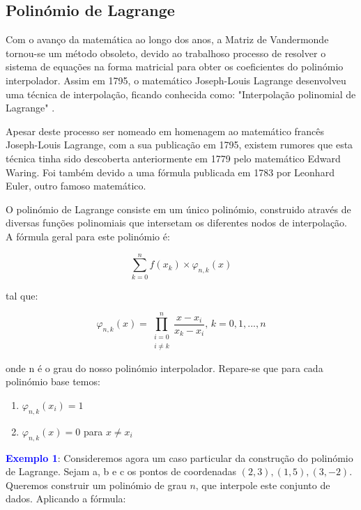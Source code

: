 \documentclass[12pt]{article}
\begin{document}
   
   



   

\subsection{Polinómio de Lagrange}
\hspace{0.5cm}Com o avanço da matemática ao longo dos anos, a Matriz de Vandermonde tornou-se um método obsoleto, devido ao trabalhoso processo de resolver o sistema de equações na forma matricial para obter os coeficientes do polinómio interpolador. Assim em 1795, o matemático Joseph-Louis Lagrange desenvolveu uma técnica de interpolação, ficando conhecida como: "Interpolação polinomial de Lagrange" \cite{wikipedia1}.

\hspace{0.5cm}Apesar deste processo ser nomeado em homenagem ao matemático francês Joseph-Louis Lagrange, com a sua publicação em 1795, existem rumores que esta técnica tinha sido descoberta anteriormente em 1779 pelo matemático Edward Waring. Foi também devido a uma fórmula publicada em 1783 por Leonhard Euler, outro famoso matemático.

\hspace{0.5cm}O polinómio de Lagrange consiste em um único polinómio, construido através de diversas funções polinomiais que intersetam os diferentes nodos de interpolação. A fórmula geral para este polinómio é:

\begin{equation}
    \sum_{k=0}^{n} f(x_k) \times \varphi_{n, k}(x)
\end{equation}

 tal que:

\begin{equation}
    \varphi_{n,k}(x) = \prod_{\substack{i=0 \\ i \neq k}}^{n} \frac{x - x_i}{x_k - x_i},\, k=0,1,...,n
\end{equation}

onde n é o grau do nosso polinómio interpolador. Repare-se que para cada polinómio base temos:
\begin{enumerate}
    \item $\varphi_{n,k}(x_i) = 1$
    \item $\varphi_{n,k}(x) = 0$ para $x \neq x_i$
\end{enumerate}\cite{website1}

{\bf{\textcolor{blue}{Exemplo 1}}}: Consideremos agora um caso particular da construção do polinómio de Lagrange. Sejam a, b e c os pontos de coordenadas $(2, 3), (1, 5), (3, -2)$. Queremos construir um polinómio de grau $n$, que interpole este conjunto de dados. Aplicando a fórmula:
\end{document}
